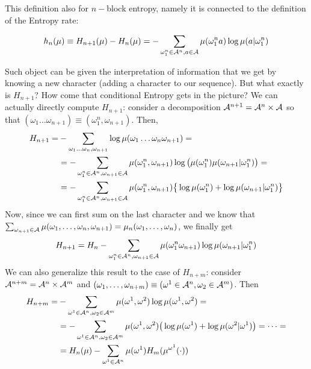 This definition also for $n-$block entropy, namely it is connected to the definition of the Entropy rate:
\begin{definition}
    \begin{equation}
        h_n(\mu) \equiv H_{n+1}(\mu) - H_n(\mu) = - \sum_{\omega_1^n \in \mathcal{A}^n, a \in \mathcal{A}} \mu(\omega_1^n a) \log \mu (a | \omega_1^n)
    \end{equation}
\end{definition}
Such object can be given the interpretation of information that we get by knowing a new character (adding a character to our sequence). 
But what exactly is $H_{n+1}$? How come that conditional Entropy gets in the picture? We can actually directly compute $H_{n+1}$: consider a decomposition $\mathcal{A}^{n+1} = \mathcal{A}^n \times \mathcal{A}$ so that $(\omega_1 \dots \omega_{n+1}) \equiv (\omega_1^n, \omega_{n+1})$. Then,
\begin{align*}
    H_{n+1} = & - \sum_{\omega_1 \dots \omega_n, \omega_{n+1}} \log \mu(\omega_1 \dots \omega_n \omega_{n+1}) = \\ &=  - \sum_{\omega_1^n \in \mathcal{A}^n, \omega_{n+1} \in \mathcal{A}} \mu (\omega_1^n, \omega_{n+1}) \log \big( \mu(\omega_1^n) \mu(\omega_{n+1} | \omega_1^n) \big) = \\ & =  - \sum_{\omega_1^n \in \mathcal{A}^n, \omega_{n+1} \in \mathcal{A}} \mu (\omega_1^n, \omega_{n+1}) \big\{ \log \mu(\omega_1^n) + \log \mu(\omega_{n+1} | \omega_1^n) \big\} 
\end{align*}
Now, since we can first sum on the last character and we know that $\sum_{\omega_{n+1} \in \mathcal{A}} \mu(\omega_1, \dots, \omega_n, \omega_{n+1}) = \mu_n(\omega_1, \dots, \omega_n)$, we finally get 
\begin{equation*}
    H_{n+1} = H_n - \sum_{\omega_1^n \in \mathcal{A}^n, \omega_{n+1} \in \mathcal{A}} \mu(\omega_1^n \omega_{n+1}) \log \mu (\omega_{n+1} | \omega_1^n)
\end{equation*}
We can also generalize this result to the case of $H_{n+m}$: consider $\mathcal{A}^{n+m} = \mathcal{A}^n \times \mathcal{A}^m$ and $(\omega_1, \dots, \omega_{n+m}) \equiv (\omega^1 \in \mathcal{A}^n, \omega_2 \in \mathcal{A}^m)$. Then
\begin{align*}
    H_{n+m} = & - \sum_{\omega^1 \in \mathcal{A}^n, \omega_2 \in \mathcal{A}^m} \mu(\omega^1, \omega^2) \log \mu(\omega^1, \omega^2) = \\ & = - \sum_{\omega^1 \in \mathcal{A}^n, \omega_2 \in \mathcal{A}^m} \mu(\omega^1, \omega^2) \big( \log \mu(\omega^1) + \log \mu(\omega^2 | \omega^1) \big) = \dots  =\\ & = H_n (\mu) - \sum_{\omega^1 \in \mathcal{A}^n} \mu(\omega^1) H_m (\mu^{\omega^1} (\cdot))
\end{align*}

